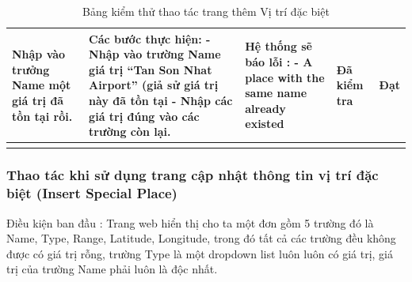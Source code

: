 \documentclass{article}
\begin{document}
\begin{longtable}{ | p{} |p{} | p{}  | p{}  | p{}  | }
\hline
Nhập vào trưởng Name một giá trị đã tồn tại rồi. &
Các bước thực hiện: \newline
- Nhập vào trường Name giá trị “Tan Son Nhat Airport” (giả sử giá trị này đã tồn tại
  \newline
- Nhập các giá trị đúng vào các trường còn lại. \newline 
&
Hệ thống sẽ báo lỗi : \newline
- A place with the same name already existed
&
Đã kiểm tra &
Đạt \\

\hline
\caption{Bảng kiểm thử thao tác trang thêm Vị trí đặc biệt}
\end{longtable} 

\subsubsection{Thao tác khi sử dụng trang cập nhật thông tin vị trí đặc biệt (Insert Special Place)  }
Điều kiện ban đầu : Trang web hiển thị cho ta một đơn gồm 5 trường đó là Name, Type, Range, Latitude, Longitude, trong đó tất cả các trường đều không được có giá trị rỗng, trường Type là một dropdown list luôn luôn có giá trị, giá trị của trường Name phải luôn là độc nhất.  \newline
\end{document}
